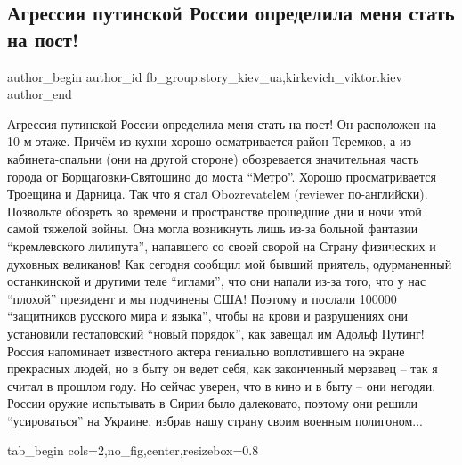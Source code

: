  
 
 
 
 
 
\subsection{Агрессия путинской России определила меня стать на пост!}
\label{sec:28_02_2022.fb.fb_group.story_kiev_ua.1.post}
 
\ifcmt
 author_begin
   author_id fb_group.story_kiev_ua,kirkevich_viktor.kiev
 author_end
\fi

Агрессия путинской России определила меня стать на пост! Он расположен на 10-м
этаже. Причём из кухни хорошо осматривается район Теремков, а из
кабинета-спальни (они на другой стороне) обозревается значительная часть города
от Борщаговки-Святошино до моста \enquote{Метро}. Хорошо просматривается Троещина и
Дарница. Так что я стал Obozrevatelем (reviewer по-английски). Позвольте
обозреть во времени и пространстве прошедшие дни и ночи этой самой тяжелой
войны. Она могла возникнуть лишь из-за больной фантазии \enquote{кремлевского
лилипута}, напавшего со своей сворой на Страну физических и духовных великанов!
Как сегодня сообщил мой бывший приятель, одурманенный останкинской и другими
теле \enquote{иглами}, что они напали из-за того, что у нас \enquote{плохой} президент и мы
подчинены США! Поэтому и послали 100000 \enquote{защитников русского мира и языка},
чтобы на крови и разрушениях они установили гестаповский \enquote{новый порядок}, как
завещал им Адольф Путинг! Россия напоминает известного актера гениально
воплотившего на экране прекрасных людей, но в быту он ведет себя, как
законченный мерзавец – так я считал в прошлом году. Но сейчас уверен, что в
кино и в быту – они негодяи.  России оружие испытывать в Сирии было далековато,
поэтому они решили \enquote{усироваться} на Украине, избрав нашу страну своим военным
полигоном...

\ifcmt
  tab_begin cols=2,no_fig,center,resizebox=0.8

